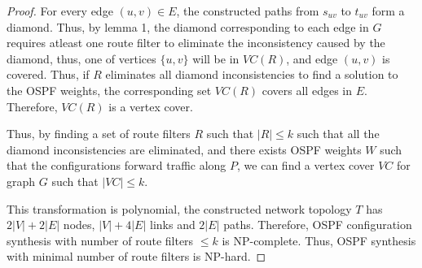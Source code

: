 \begin{proof}
For every edge $(u,v) \in E$, the constructed paths from 
$s_{uv}$ to $t_{uv}$ form a diamond. Thus, by lemma 1, 
the diamond corresponding to each edge in $G$ 
requires atleast one route filter to eliminate
the inconsistency caused by the diamond, thus, one 
of vertices $\{u,v\}$ will be in $VC(R)$, and edge $(u,v)$
is covered. Thus, if $R$ eliminates all diamond inconsistencies
to find a solution to the OSPF weights, the corresponding set
$VC(R)$ covers all edges in $E$. Therefore, $VC(R)$ is a vertex
cover. 

Thus, by finding a set of route filters $R$ such that $|R| \leq k$
such that all the diamond inconsistencies are eliminated, and there
exists OSPF weights $W$ such that the configurations forward traffic
along $P$, we can find a vertex cover $VC$ for graph $G$ such that
$|VC| \leq k$. 

This transformation is polynomial, the constructed 
network topology $T$ has $2|V| + 2|E|$ nodes, 
$|V| + 4|E|$ links and $2|E|$ paths. Therefore, OSPF
configuration synthesis with number of route filters $\leq k$ is
NP-complete. Thus, OSPF synthesis with minimal number of 
route filters is NP-hard. 
\end{proof}
